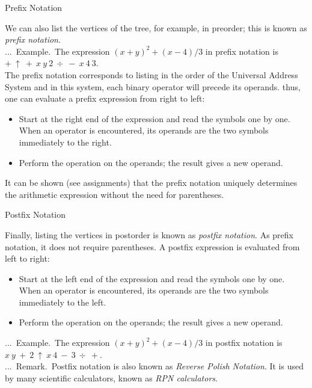 \documentclass[smaller,hyperref={CJKbookmarks=true}]{beamer}
\newcounter{zhuo}[subsection]
\renewcommand{\thezhuo}{\thesection.\thesubsection.\arabic{zhuo}}
\newenvironment{REMARK}{\stepcounter{zhuo}\alert{\thezhuo.~Remark.\,}}{}
\newenvironment{EXAMPLE}{\stepcounter{zhuo}\alert{\!\thezhuo.~Example.\,}}{}
\begin{document}
\begin{frame}[t]{Prefix Notation}
\begin{spacing}{1.1}
We can also list the vertices of the tree, for example, in preorder; this is
known as \emph{prefix notation}.\\[6pt]
\begin{EXAMPLE}
The expression $(x+y)^2+(x-4)/3$ in prefix notation is $+~\uparrow~+~x~y~2~\div~-~x~4~3$.\\[5pt]
The prefix notation corresponds to listing in the order of the Universal
Address System and in this system, each binary operator will precede its
operands. thus, one can evaluate a prefix expression from right to left:
\begin{itemize}
  \item Start at the right end of the expression and read the symbols one by one. When an operator is encountered, its operands are the two symbols immediately to the right.
  \item Perform the operation on the operands; the result gives a new operand.
\end{itemize}
It can be shown (see assignments) that the prefix notation uniquely
determines the arithmetic expression without the need for parentheses.
\end{EXAMPLE}
\end{spacing}
\end{frame}
\begin{frame}[t]{Postfix Notation}
\begin{spacing}{1.1}
Finally, listing the vertices in postorder is known as \emph{postfix notation}. As
prefix notation, it does not require parentheses. A postfix expression is
evaluated from left to right:
\begin{itemize}
  \item Start at the left end of the expression and read the symbols one by one. When an operator is encountered, its operands are the two symbols immediately to the left.
  \item Perform the operation on the operands; the result gives a new operand.
\end{itemize}
\vspace*{6pt}
\begin{EXAMPLE}
The expression $(x+y)^2+(x-4)/3$ in postfix notation is $x~y~+~2~\uparrow~x~4~-~3~\div~+$.\\[6pt]
\end{EXAMPLE}
\begin{REMARK}
Postfix notation is also known as \emph{Reverse Polish Notation}.
It is used by many scientific calculators, known as \emph{RPN calculators}.
\end{REMARK}
\end{spacing}
\end{frame}
\end{document}
